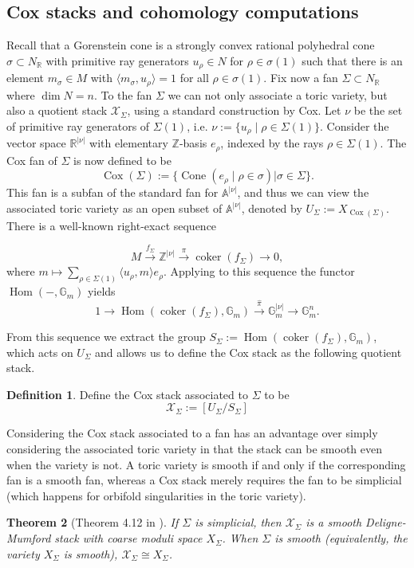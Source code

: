 \documentclass[reqno, 12pt]{amsart}
\newtheorem{theorem}{Theorem}[section]
\theoremstyle{definition}
\newtheorem{definition}[theorem]{Definition}
\numberwithin{equation}{section}
\newcommand{\newterm}{\textsf}
\newcommand{\Hom}{\operatorname{Hom}}
\newcommand{\Z}{\mathbb{Z}}
\newcommand{\R}{\mathbb{R}}
\newcommand{\A}{\mathbb{A}}
\newcommand{\cone}{\operatorname{Cone}}
\begin{document}
\subsection{Cox stacks and cohomology computations}
Recall that a \newterm{Gorenstein} cone is a strongly convex rational polyhedral cone $\sigma\subset N_\R$ with primitive ray generators $u_\rho\in N$ for $\rho\in \sigma(1)$ such that there is an element $m_\sigma\in M$ with $\langle m_\sigma, u_\rho\rangle=1$ for all $\rho\in \sigma(1)$. 
Fix now a fan $\Sigma\subset N_\R$ where $\dim N=n$. To the fan $\Sigma$ we can not only associate a toric variety, but also a quotient stack $\mathcal{X}_\Sigma$, using a standard construction by Cox. Let $\nu$ be the set of primitive ray generators of $\Sigma(1)$, i.e. $\nu:=\{u_\rho\mid \rho\in \Sigma(1)\}$. Consider the vector space $\R^{|\nu|}$ with elementary $\Z$-basis $e_\rho$, indexed by the rays $\rho\in \Sigma(1)$. The \newterm{Cox fan} of $\Sigma$ is now defined to be \[
\operatorname{Cox}(\Sigma):=\{\cone(e_\rho\mid \rho\in \sigma)\vert\sigma\in \Sigma\}.
\]
This fan is a subfan of the standard fan for $\A^{|\nu|}$, and thus we can view the associated toric variety as an open subset of $\A^{|\nu|}$, denoted by $U_\Sigma:=X_{\operatorname{Cox}(\Sigma)}$. There is a well-known right-exact sequence

\begin{equation}\label{eqn:Coxseqpre}
 M\xrightarrow{f_\Sigma}\Z^{|\nu|}\xrightarrow{\pi}\operatorname{coker}(f_\Sigma)\rightarrow 0,
\end{equation} 
where $m\mapsto \sum_{\rho\in\Sigma(1)}\langle u_\rho,m\rangle e_\rho\nonumber$. Applying to this sequence the functor $\Hom(-,\mathbb{G}_m)$ yields
\[
1\rightarrow \Hom(\operatorname{coker}(f_\Sigma),\mathbb{G}_m)\xrightarrow{\hat{\pi}}\mathbb{G}_m^{|\nu|}\rightarrow\mathbb{G}_m^n.
\]

From this sequence we extract the group $S_\Sigma:=\Hom(\operatorname{coker}(f_\Sigma),\mathbb{G}_m)$, which acts on $U_\Sigma$ and allows us to define the \newterm{Cox stack} as the following quotient stack.
\begin{definition}
    \label{Def:Coxstack}
    Define the \newterm{Cox stack} associated to $\Sigma$ to be \[
    \mathcal{X}_\Sigma:=[U_\Sigma/S_\Sigma]
    \]
\end{definition}

Considering the Cox stack associated to a fan has an advantage over simply considering the associated toric variety in that the stack can be smooth even when the variety is not. A toric variety is smooth if and only if the corresponding fan is a smooth fan, whereas a Cox stack merely requires the fan to be simplicial (which happens for orbifold singularities in the toric variety).
\begin{theorem}[Theorem 4.12 in \cite{FK18}]
    \label{Thm:4.12FK18}
    If $\Sigma$ is simplicial, then $\mathcal{X}_\Sigma$ is a smooth Deligne-Mumford stack with coarse moduli space $X_\Sigma$. When $\Sigma$ is smooth (equivalently, the variety $X_\Sigma$ is smooth), $\mathcal{X}_\Sigma\cong X_\Sigma$.
\end{theorem}
\end{document}
